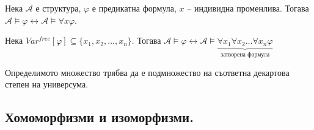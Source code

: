\documentclass{article}
\begin{document}
\begin{thm}
Нека $\mathcal{A}$ е структура, $\varphi$ е предикатна формула, $x$ -- индивидна променлива. Тогава $\mathcal{A} \models \varphi \longleftrightarrow \mathcal{A} \models \forall x\varphi$.

\begin{conseq}
Нека $Var^{free}[\varphi] \subseteq \{x_1, x_2, \ldots, x_n\}$. Тогава $\mathcal{A} \models \varphi \longleftrightarrow \mathcal{A} \models \underbrace{\forall x_1\forall x_2\ldots\forall x_n\varphi}_{\text{затворена формула}}$
\end{conseq}

\setcounter{conseq}{0}

\begin{remark}
Определимото множество трябва да е подмножество на съответна декартова степен на универсума.
\end{remark}

\end{thm}

\subsection*{Хомоморфизми и изоморфизми.}
\end{document}
